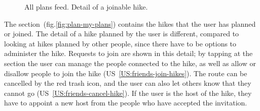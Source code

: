 \begin{figure}[h!]
    \centering
    \hfill
    \hfill
    \caption{All plans feed. Detail of a joinable hike.}
    \label{fig:plan-all-plans}
\end{figure}

The  section~(fig.\ref{fig:plan-my-plans}) contains the hikes that the user has planned or joined.
The detail of a hike planned by the user is different, compared to looking at hikes planned by other people,
since there have to be options to administer the hike.
Requests to join are shown in this detail; by tapping at the  section the user can manage the people connected to the hike, as well as allow or disallow people to join the hike (US~\ref{US:friends-join-hikes}).
The route can be cancelled by the red trash icon, and the user can also let others know that they cannot go (US~\ref{US:friends-cancel-hike}).
If the user is the host of the hike, they have to appoint a new host from the people who have accepted the invitation.

